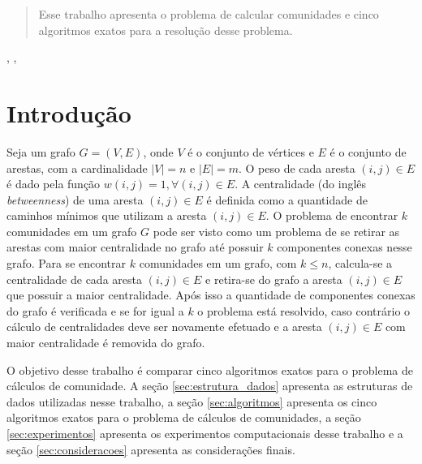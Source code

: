 \documentclass{proc}
\begin{document}

\author{João C. Abreu}



\begin{abstract}
Esse trabalho apresenta o problema de calcular comunidades e cinco algoritmos exatos para a resolução desse problema.

\end{abstract}

\begin{keywords}
, , 
\end{keywords}

\doublespacing

\section{Introdução}
\label{sec:intro}

Seja um grafo $G = (V,E)$, onde $V$ é o conjunto de vértices e $E$ é o conjunto de arestas, com a cardinalidade $|V| = n$ e 
$|E| = m$. O peso de cada aresta $(i, j) \in E$ é dado pela função $w(i, j) = 1, \forall (i, j) \in E$. A
centralidade (do inglês \emph{betweenness}) de uma aresta $(i, j) \in E$ é definida como a quantidade de caminhos mínimos que utilizam
a aresta $(i, j) \in E$. O problema de encontrar $k$ comunidades em um grafo $G$ pode ser visto como um problema de se 
retirar as arestas com maior centralidade no grafo até possuir $k$ componentes conexas nesse grafo. Para se encontrar $k$ comunidades em um grafo, com $k \leq n$, calcula-se a centralidade de cada 
aresta $(i, j) \in E$ e retira-se do grafo a aresta $(i, j) \in E$ que possuir a maior centralidade. Após isso a quantidade de componentes conexas do grafo é verificada e se for igual a $k$ o problema está resolvido, caso contrário o cálculo de centralidades
deve ser novamente efetuado e a aresta $(i, j) \in E$ com maior centralidade é removida do grafo.

O objetivo desse trabalho é comparar cinco algoritmos exatos para o problema de cálculos de comunidade. 
A seção \ref{sec:estrutura_dados} apresenta as estruturas de dados utilizadas nesse trabalho, a seção \ref{sec:algoritmos}
apresenta os cinco algoritmos exatos para o problema de cálculos de comunidades, a seção \ref{sec:experimentos}
apresenta os experimentos computacionais desse trabalho e a seção \ref{sec:consideracoes} apresenta as considerações finais.










\end{document}
